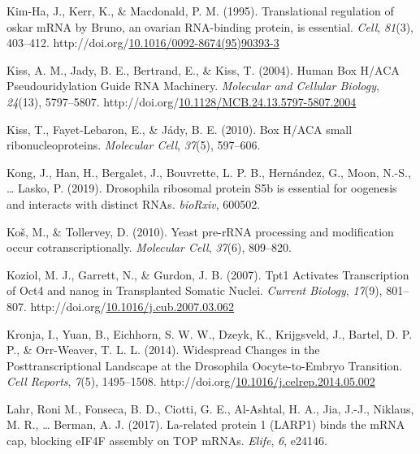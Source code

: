 \documentclass[12pt,oneside]{reedthesis}
\newlength{\cslhangindent}
\newenvironment{CSLReferences}[2] %
 {%
  \setlength{\parindent}{0pt}
  \ifodd #1 \everypar{\setlength{\hangindent}{\cslhangindent}}\ignorespaces\fi
  \ifnum #2 > 0
  \setlength{\parskip}{#2\baselineskip}
  \fi
 }%
 {}
\begin{document}
\begin{CSLReferences}{1}{0}
\leavevmode{}%
Kim-Ha, J., Kerr, K., \& Macdonald, P. M. (1995). Translational regulation of oskar {mRNA} by {Bruno}, an ovarian {RNA}-binding protein, is essential. \emph{Cell}, \emph{81}(3), 403--412. http://doi.org/\href{https://doi.org/10.1016/0092-8674(95)90393-3}{10.1016/0092-8674(95)90393-3}

\leavevmode{}%
Kiss, A. M., Jady, B. E., Bertrand, E., \& Kiss, T. (2004). Human {Box H}/{ACA Pseudouridylation Guide RNA Machinery}. \emph{Molecular and Cellular Biology}, \emph{24}(13), 5797--5807. http://doi.org/\href{https://doi.org/10.1128/MCB.24.13.5797-5807.2004}{10.1128/MCB.24.13.5797-5807.2004}

\leavevmode{}%
Kiss, T., Fayet-Lebaron, E., \& Jády, B. E. (2010). Box {H}/{ACA} small ribonucleoproteins. \emph{Molecular Cell}, \emph{37}(5), 597--606.

\leavevmode{}%
Kong, J., Han, H., Bergalet, J., Bouvrette, L. P. B., Hernández, G., Moon, N.-S., \ldots{} Lasko, P. (2019). Drosophila ribosomal protein {S5b} is essential for oogenesis and interacts with distinct {RNAs}. \emph{bioRxiv}, 600502.

\leavevmode{}%
Koš, M., \& Tollervey, D. (2010). Yeast pre-{rRNA} processing and modification occur cotranscriptionally. \emph{Molecular Cell}, \emph{37}(6), 809--820.

\leavevmode{}%
Koziol, M. J., Garrett, N., \& Gurdon, J. B. (2007). Tpt1 {Activates Transcription} of Oct4 and nanog in {Transplanted Somatic Nuclei}. \emph{Current Biology}, \emph{17}(9), 801--807. http://doi.org/\href{https://doi.org/10.1016/j.cub.2007.03.062}{10.1016/j.cub.2007.03.062}

\leavevmode{}%
Kronja, I., Yuan, B., Eichhorn, S. W. W., Dzeyk, K., Krijgsveld, J., Bartel, D. P. P., \& Orr-Weaver, T. L. L. (2014). Widespread {Changes} in the {Posttranscriptional Landscape} at the {Drosophila Oocyte}-to-{Embryo Transition}. \emph{Cell Reports}, \emph{7}(5), 1495--1508. http://doi.org/\href{https://doi.org/10.1016/j.celrep.2014.05.002}{10.1016/j.celrep.2014.05.002}

\leavevmode{}%
Lahr, Roni M., Fonseca, B. D., Ciotti, G. E., Al-Ashtal, H. A., Jia, J.-J., Niklaus, M. R., \ldots{} Berman, A. J. (2017). La-related protein 1 ({LARP1}) binds the {mRNA} cap, blocking {eIF4F} assembly on {TOP mRNAs}. \emph{Elife}, \emph{6}, e24146.


\end{CSLReferences}
\end{document}
